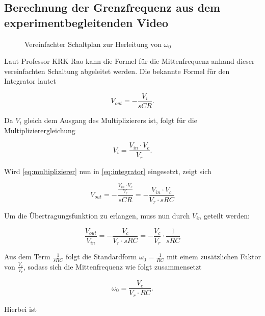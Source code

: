 \documentclass[../main.tex]{subfiles}
\begin{document}
\subsection*{Berechnung der Grenzfrequenz aus dem experimentbegleitenden Video}

\begin{figure}[!h]
  \centering
  \resizebox{0.8\textwidth}{!}{}
  \caption{Vereinfachter Schaltplan zur Herleitung von $\omega_0$}
  \label{fig:bsb_w0}
\end{figure}

Laut Professor KRK Rao kann die Formel für die Mittenfrequenz anhand dieser vereinfachten Schaltung abgeleitet werden. Die bekannte Formel für den Integrator lautet

\begin{equation}
  V_{out} = -\frac{V_{i}}{sCR} \label{eq:integrator}.
\end{equation}

Da $V_{i}$ gleich dem Ausgang des Multiplizierers ist, folgt für die Multiplizierergleichung

\begin{equation}
  V_{i} = \frac{V_{in} \cdot V_c}{V_r} \label{eq:multiplizierer}.
\end{equation}

Wird \eqref{eq:multiplizierer} nun in \eqref{eq:integrator} eingesetzt, zeigt sich

\begin{equation*}
  V_{out} = -\frac{\frac{V_{in} \cdot V_c}{V_r}}{sCR} = -\frac{V_{in} \cdot V_c}{V_r \cdot sRC}
\end{equation*}

Um die Übertragungsfunktion zu erlangen, muss nun durch $V_{in}$ geteilt werden:

\begin{equation*}
  \frac{V_{out}}{V_{in}} = -\frac{V_c}{V_r \cdot sRC} = - \frac{V_c}{V_r} \cdot \frac{1}{sRC}
\end{equation*}

Aus dem Term $\frac{1}{sRC}$ folgt die Standardform $\omega_0 = \frac{1}{RC}$ mit einem zusätzlichen Faktor von $\frac{V_c}{V_r}$, sodass sich die Mittenfrequenz wie folgt zusammensetzt

\begin{equation}
  \omega_0 = \frac{V_c}{V_r \cdot RC}.
  \label{eq:freq-vcf}
\end{equation}

Hierbei ist
\end{document}
